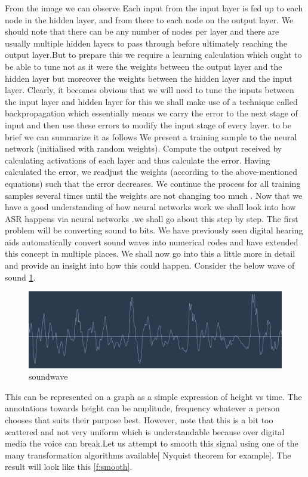 \documentclass[sigconf]{acmart}
\begin{document}
From the image we can observe Each input from the input layer is fed up to each node in the hidden layer, and from there to each node on the output layer. We should note that there can be any number of nodes per layer and there are usually multiple hidden layers to pass through before ultimately reaching the output layer.But to prepare this we require a learning calculation which ought to be able to tune not as it were the weights between the output layer and the hidden layer but moreover the weights between the hidden layer and the input layer. Clearly, it becomes obvious that we will need to tune the inputs between the input layer and hidden layer for this we shall make use of a technique called backpropagation which essentially means we carry the error to the next stage of input and then use these errors to modify the input stage of every layer. to be brief we can summarize it as follows We present a training sample to the neural network (initialised with random weights). Compute the output received by calculating activations of each layer and thus calculate the error. Having calculated the error, we readjust the weights (according to the above-mentioned equations) such that the error decreases. We continue the process for all training samples several times until the weights are not changing too much \cite{Pokarna2017}. 
\newline
Now that we have a good understanding of how neural networks work we shall look into how ASR happens via neural networks \cite{Green1999}.we shall go about this step by step. The first problem will be converting sound to bits. We have previously seen digital hearing aids automatically convert sound waves into numerical codes and have extended this concept in multiple places. We shall now go into this a little more in detail and provide an insight into how this could happen. Consider the below wave of sound \ref{f:soundwave}.
\begin{figure}[!ht]
  \centering\includegraphics[width=\columnwidth]{images/hellowwave.jpg}
  \caption{soundwave}\label{f:soundwave}
\end{figure}  
This can be represented on a graph as a simple expression of height vs time. The annotations towards height can be amplitude, frequency whatever a person chooses that suits their purpose best. However, note that this is a bit too scattered and not very uniform which is understandable because over digital media the voice can break.Let us attempt to smooth this signal using one of the many transformation algorithms available[ Nyquist theorem for example]. The result will look like this \ref{f:smooth}.
\end{document}
